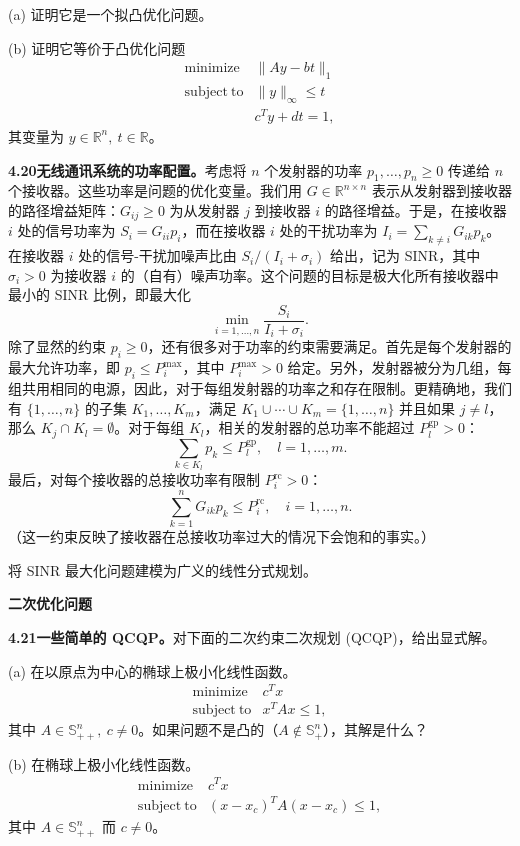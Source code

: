 \documentclass[UTF8, 12pt, fontset=fandol, oneside]{ctexart}
\begin{document}
(a) 证明它是一个拟凸优化问题。

(b) 证明它等价于凸优化问题
\[
\begin{array}{ll}
\mathop{\mathrm{minimize}} & \|Ay-bt\|_1\\
\mathrm{subject\ to} & \|y\|_\infty\leq t\\
& c^Ty+dt=1,
\end{array}
\]
其变量为 $y\in\mathbb{R}^n,\ t\in\mathbb{R}$。

\noindent\textbf{4.20\quad 无线通讯系统的功率配置。}\quad 考虑将 $n$ 个发射器的功率 $p_1,\ldots,p_n\geq0$ 传递给 $n$ 个接收器。这些功率是问题的优化变量。我们用 $G\in\mathbb{R}^{n\times n}$ 表示从发射器到接收器的路径增益矩阵：$G_{ij}\geq0$ 为从发射器 $j$ 到接收器 $i$ 的路径增益。于是，在接收器 $i$ 处的信号功率为 $S_i=G_{ii}p_i$，而在接收器 $i$ 处的干扰功率为 $I_i=\sum_{k\neq i}G_{ik}p_k$。在接收器 $i$ 处的信号-干扰加噪声比由 $S_i/(I_i+\sigma_i)$ 给出，记为 SINR，其中 $\sigma_i>0$ 为接收器 $i$ 的（自有）噪声功率。这个问题的目标是极大化所有接收器中最小的 SINR 比例，即最大化
\[
\min_{i=1,\ldots,n}\frac{S_i}{I_i+\sigma_i}.
\]
除了显然的约束 $p_i\geq0$，还有很多对于功率的约束需要满足。首先是每个发射器的最大允许功率，即 $p_i\leq P_i^{\max}$，其中 $P_i^{\max}>0$ 给定。另外，发射器被分为几组，每组共用相同的电源，因此，对于每组发射器的功率之和存在限制。更精确地，我们有 $\{1,\ldots,n\}$ 的子集 $K_1,\ldots,K_m$，满足 $K_1\cup\cdots\cup K_m=\{1,\ldots,n\}$ 并且如果 $j\neq l$，那么 $K_j\cap K_l=\emptyset$。对于每组 $K_l$，相关的发射器的总功率不能超过 $P_l^{\mathrm{gp}}>0$：
\[
\sum_{k\in K_l}p_k\leq P_l^{\mathrm{gp}},\quad l=1,\ldots,m.
\]
最后，对每个接收器的总接收功率有限制 $P_i^{\mathrm{rc}}>0$：
\[
\sum_{k=1}^n G_{ik}p_k\leq P_i^{\mathrm{rc}},\quad i=1,\ldots,n.
\]
（这一约束反映了接收器在总接收功率过大的情况下会饱和的事实。）

将 SINR 最大化问题建模为广义的线性分式规划。

\noindent\textbf{二次优化问题}

\noindent\textbf{4.21\quad 一些简单的 QCQP。}\quad 对下面的二次约束二次规划 (QCQP)，给出显式解。

(a) 在以原点为中心的椭球上极小化线性函数。
\[
\begin{array}{ll}
\mathop{\mathrm{minimize}} & c^Tx\\
\mathrm{subject\ to} & x^TAx\leq1,
\end{array}
\]
其中 $A\in\mathbb{S}_{++}^n,\ c\neq0$。如果问题不是凸的（$A\notin\mathbb{S}_+^n$），其解是什么？

(b) 在椭球上极小化线性函数。
\[
\begin{array}{ll}
\mathop{\mathrm{minimize}} & c^Tx\\
\mathrm{subject\ to} & (x-x_c)^TA(x-x_c)\leq1,
\end{array}
\]
其中 $A\in\mathbb{S}_{++}^n$ 而 $c\neq0$。
\end{document}
